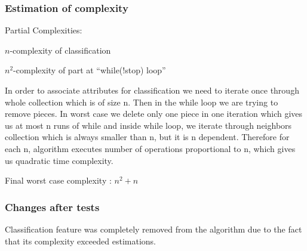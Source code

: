 \subsubsection{Estimation of complexity}
Partial Complexities:

$n$-complexity of classification

$n^2$-complexity of part at “while(!stop) loop”

In order to associate attributes for classification we need to iterate once through whole collection
which is of size n. Then in the while loop we are trying to remove pieces. In worst case we delete
only one piece in one iteration which gives us at most n runs of while and inside while loop, we
iterate through neighbors collection which is always smaller than n, but it is n dependent.
Therefore for each n, algorithm executes number of operations proportional to n, which gives us
quadratic time complexity.

Final worst case complexity : $n^2 + n$

\subsubsection{Changes after tests}

Classification feature was completely removed from the algorithm due to the fact that its complexity
exceeded estimations.

